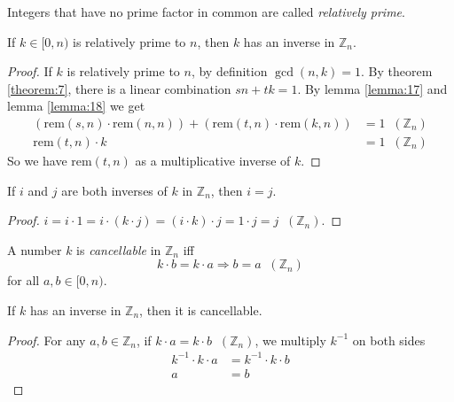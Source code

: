 \documentclass[11pt]{article}
\newcommand{\rem}{\mathrm{rem}}
\begin{document}
\begin{definition}
Integers that have no prime factor in common are called \emph{relatively prime}.
\end{definition}

\begin{lemma}
If $k \in [0, n)$ is relatively prime to $n$, then $k$ has an inverse in $\mathbb{Z}_n$.
\end{lemma}

\begin{proof}
If $k$ is relatively prime to $n$, by definition $\gcd(n,k) = 1$. By theorem
\ref{theorem:7}, there is a linear combination $sn+tk=1$. By lemma \ref{lemma:17} and lemma
\ref{lemma:18} we get
\begin{align*}
  (\rem(s,n) \cdot \rem(n,n)) + (\rem(t,n) \cdot \rem(k,n)) &= 1 \;\;(\mathbb{Z}_n) \\
  \rem(t,n) \cdot k &= 1 \;\;(\mathbb{Z}_n)
\end{align*}
So we have $\rem(t,n)$ as a multiplicative inverse of $k$.
\end{proof}

\begin{lemma}
If $i$ and $j$ are both inverses of $k$ in $\mathbb{Z}_n$, then $i = j$.
\end{lemma}

\begin{proof}
$i = i \cdot 1 = i \cdot (k \cdot j) = (i \cdot k) \cdot j = 1 \cdot j = j
\;\;(\mathbb{Z}_n)$.
\end{proof}

\begin{definition}
A number $k$ is \emph{cancellable} in $\mathbb{Z}_n$ iff
\[
  k \cdot b = k \cdot a \Rightarrow b = a \;\;(\mathbb{Z}_n)
\]
for all $a, b \in [0, n)$.
\end{definition}

\begin{lemma}
If $k$ has an inverse in $\mathbb{Z}_n$, then it is cancellable.
\end{lemma}

\begin{proof}
For any $a, b \in \mathbb{Z}_n$, if $k \cdot a = k \cdot b \;\;(\mathbb{Z}_n)$, we multiply
$k^{-1}$ on both sides
\begin{align*}
k^{-1} \cdot k \cdot a &= k^{-1} \cdot k \cdot b \\
a &= b
\end{align*}
\end{proof}
\end{document}
